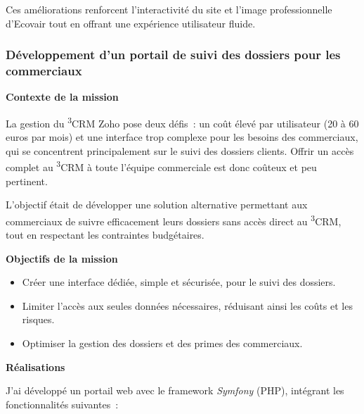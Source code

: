 Ces améliorations renforcent l’interactivité du site et l’image professionnelle d’Ecovair tout en offrant une expérience utilisateur fluide.

\subsubsection{Développement d’un portail de suivi des dossiers pour les commerciaux}

\textbf{Contexte de la mission}\vspace{0.3cm}

La gestion du \textsuperscript{3}CRM Zoho pose deux défis~: un coût élevé par utilisateur (20 à 60 euros par mois) et une interface trop complexe pour les besoins des commerciaux, qui se concentrent principalement sur le suivi des dossiers clients. Offrir un accès complet au \textsuperscript{3}CRM à toute l’équipe commerciale est donc coûteux et peu pertinent.

L’objectif était de développer une solution alternative permettant aux commerciaux de suivre efficacement leurs dossiers sans accès direct au \textsuperscript{3}CRM, tout en respectant les contraintes budgétaires.\vspace{0.3cm}

\textbf{Objectifs de la mission}\vspace{0.3cm}

\begin{itemize}
    \item Créer une interface dédiée, simple et sécurisée, pour le suivi des dossiers.\vspace{0.3cm}
    \item Limiter l’accès aux seules données nécessaires, réduisant ainsi les coûts et les risques.\vspace{0.3cm}
    \item Optimiser la gestion des dossiers et des primes des commerciaux.\vspace{0.3cm}
\end{itemize}

\textbf{Réalisations}\vspace{0.3cm}

J’ai développé un portail web avec le framework \textit{Symfony} (PHP), intégrant les fonctionnalités suivantes~:\vspace{0.3cm}

